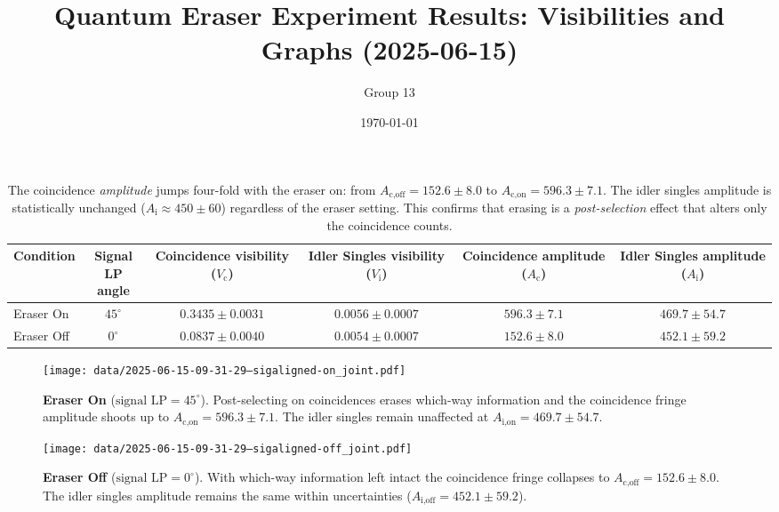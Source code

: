 \documentclass[twocolumn]{article}
\title{Quantum Eraser Experiment Results: Visibilities and Graphs (2025-06-15)}
\author{Group 13} %
\date{\today}
\begin{document}
\pagestyle{empty} %

\begin{table*}[h!]
\centering
\begin{tabular}{lccccc}
\toprule
Condition & \makecell{Signal \\ LP angle} & \makecell{Coincidence \\ visibility ($V_{\text{c}}$)} & \makecell{Idler Singles \\ visibility ($V_{\text{i}}$)} & \makecell{Coincidence \\ amplitude ($A_{\text{c}}$)} & \makecell{Idler Singles \\ amplitude ($A_{\text{i}}$)} \\
\midrule
Eraser On   & $45^\circ$ & $0.3435 \pm 0.0031$ & $0.0056 \pm 0.0007$ & $596.3 \pm 7.1$ & $469.7 \pm 54.7$ \\
Eraser Off  & $0^\circ$  & $0.0837 \pm 0.0040$ & $0.0054 \pm 0.0007$ & $152.6 \pm 8.0$ & $452.1 \pm 59.2$ \\
\bottomrule
\end{tabular}
\caption*{
  The coincidence \emph{amplitude} jumps four-fold with the eraser on: 
  from $A_{\text{c,off}} = 152.6 \pm 8.0$ to
  $A_{\text{c,on}} = 596.3 \pm 7.1$. 
  The idler singles amplitude is statistically unchanged 
  ($A_{\text{i}} \approx 450 \pm 60$) regardless of the eraser setting. 
  This confirms that erasing is a \emph{post-selection} effect that
  alters only the coincidence counts.
}
\end{table*}

\begin{figure}[h!]
\centering
\texttt{[image: data/2025-06-15-09-31-29--sigaligned-on\_joint.pdf]}
\caption*{
  \textbf{Eraser On} ($\text{signal LP}=45^\circ$).  Post-selecting on coincidences
  erases which-way information and the coincidence fringe amplitude shoots up to
  $A_{\text{c,on}} = 596.3 \pm 7.1$.
  The idler singles remain unaffected at
  $A_{\text{i,on}} = 469.7 \pm 54.7$.
}
\end{figure}

\begin{figure}[h!]
\centering
\texttt{[image: data/2025-06-15-09-31-29--sigaligned-off\_joint.pdf]}
\caption*{
  \textbf{Eraser Off} ($\text{signal LP}=0^\circ$).  With which-way information left
  intact the coincidence fringe collapses to
  $A_{\text{c,off}} = 152.6 \pm 8.0$.
  The idler singles amplitude remains the same within uncertainties
  ($A_{\text{i,off}} = 452.1 \pm 59.2$).
}
\end{figure}
\end{document}
